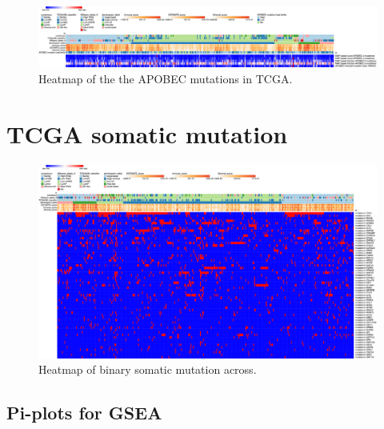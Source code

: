 \begin{figure}[!htb]   
\centering
\includegraphics[width=1.0\textwidth,height=1.0\textheight,keepaspectratio]{Sections/Network_I/Resources/selective_pruning/sel_tfs_apobec_meta.png}
  \caption{Heatmap of the the APOBEC mutations in TCGA.}
\label{fig:ap:sel_tfs_tcga_meta_apobec}
\end{figure}

\newpage 


\section{TCGA somatic mutation}

\begin{figure}[!htb]   
\centering
\includegraphics[width=1.0\textwidth,height=1.0\textheight,keepaspectratio]{Sections/Network_I/Resources/selective_pruning/sel_tfs_mut_meta.png}
  \caption{Heatmap of binary somatic mutation across.}
\label{fig:ap:sel_tfs_tcga_meta_mut}
\end{figure}

\newpage

\subsection{Pi-plots for GSEA} \label{s:ap:sel_prun_pi}


